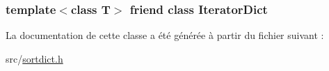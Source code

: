 \subsubsection[{Iterator\+Dict}]{\setlength{\rightskip}{0pt plus 5cm}template$<$class T$>$ friend class {\bf Iterator\+Dict}\hspace{0.3cm}{\ttfamily [friend]}}\label{class_s_int_dict_ab362b5ead75b40c212098db068d50ac7}


La documentation de cette classe a été générée à partir du fichier suivant \+:\begin{DoxyCompactItemize}
\item 
src/\hyperlink{sortdict_8h}{sortdict.\+h}\end{DoxyCompactItemize}
